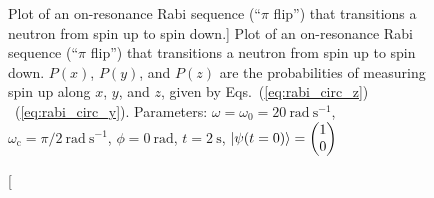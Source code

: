\begin{figure}
\begin{subfigure}{.45\textwidth}
\end{subfigure}
\caption
[Plot of an on-resonance Rabi sequence (``$\pi$ flip'') that transitions a neutron from spin up to spin down.]
{Plot of an on-resonance Rabi sequence (``$\pi$ flip'') that transitions a neutron from spin up to spin down. $P(x)$, $P(y)$, and $P(z)$ are the probabilities of measuring spin up along $x$, $y$, and $z$, given by Eqs.~(\ref{eq:rabi_circ_z}) \textendash ~(\ref{eq:rabi_circ_y}). Parameters: $\omega=\omega_0=\qty{20}{\radian\ \s^{-1}}$, $\omega_\text{c}=\pi/\qty{2}{\radian\ \s^{-1}}$, $\phi=\qty{0}{\radian}$, $t=\qty{2}{\s}$, $\Ket{\psi(t=0)}=\left( \begin{matrix}
    1 \\
    0
\end{matrix}\right)$}
\label{fig:rabi_circ_pi_pulse}


\end{figure}

